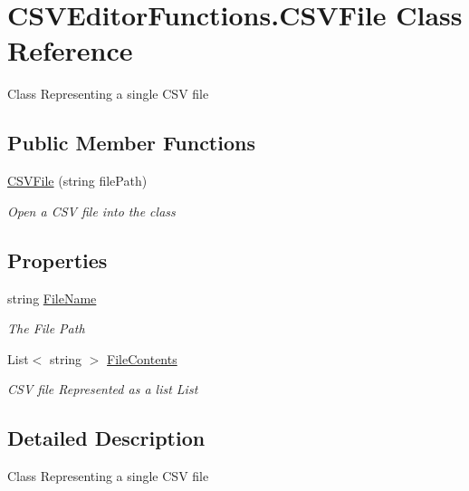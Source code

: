\hypertarget{class_c_s_v_editor_functions_1_1_c_s_v_file}{}\section{C\+S\+V\+Editor\+Functions.\+C\+S\+V\+File Class Reference}
\label{class_c_s_v_editor_functions_1_1_c_s_v_file}


Class Representing a single C\+SV file  


\subsection*{Public Member Functions}
\begin{DoxyCompactItemize}
\item 
\mbox{\hyperlink{class_c_s_v_editor_functions_1_1_c_s_v_file_a73bd62298c2835a5f451c0f315f935e9}{C\+S\+V\+File}} (string file\+Path)
\begin{DoxyCompactList}\small\item\em Open a C\+SV file into the class \end{DoxyCompactList}\end{DoxyCompactItemize}
\subsection*{Properties}
\begin{DoxyCompactItemize}
\item 
string \mbox{\hyperlink{class_c_s_v_editor_functions_1_1_c_s_v_file_ad692567c4f95f23945cf661da3d573c8}{File\+Name}}
\begin{DoxyCompactList}\small\item\em The File Path \end{DoxyCompactList}\item 
List$<$ string $>$ \mbox{\hyperlink{class_c_s_v_editor_functions_1_1_c_s_v_file_ab6d28a5bed44355befc4e395271ff5eb}{File\+Contents}}
\begin{DoxyCompactList}\small\item\em C\+SV file Represented as a list List \end{DoxyCompactList}\end{DoxyCompactItemize}


\subsection{Detailed Description}
Class Representing a single C\+SV file 



